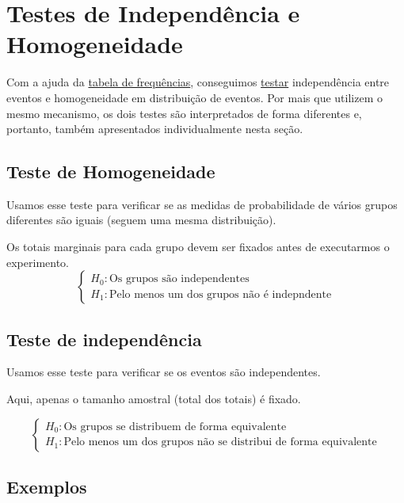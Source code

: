 \documentclass[
  letterpaper,
  DIV=11,
  numbers=noendperiod]{scrreprt}
\begin{document}

\chapter{Testes de Independência e
Homogeneidade}\label{testes-de-independuxeancia-e-homogeneidade}

Com a ajuda da \href{tabela-frequencias.qmd}{tabela de frequências},
conseguimos \href{teste-hipotese.qmd}{testar} independência entre
eventos e homogeneidade em distribuição de eventos. Por mais que
utilizem o mesmo mecanismo, os dois testes são interpretados de forma
diferentes e, portanto, também apresentados individualmente nesta seção.

\section{Teste de Homogeneidade}\label{teste-de-homogeneidade}

Usamos esse teste para verificar se as medidas de probabilidade de
vários grupos diferentes são iguais (seguem uma mesma distribuição).

Os totais marginais para cada grupo devem ser fixados antes de
executarmos o experimento. \[
\begin{cases}
H_{0}: \text{Os grupos são independentes} \\
H_{1} : \text{Pelo menos um dos grupos não é indepndente}
\end{cases}
\]

\section{Teste de independência}\label{teste-de-independuxeancia}

Usamos esse teste para verificar se os eventos são independentes.

Aqui, apenas o tamanho amostral (total dos totais) é fixado.

\[
\begin{cases}
H_{0}: \text{Os grupos se distribuem de forma equivalente} \\
H_{1} : \text{Pelo menos um dos grupos não se distribui de forma equivalente}
\end{cases}
\]

\section{Exemplos}\label{exemplos-3}
\end{document}
